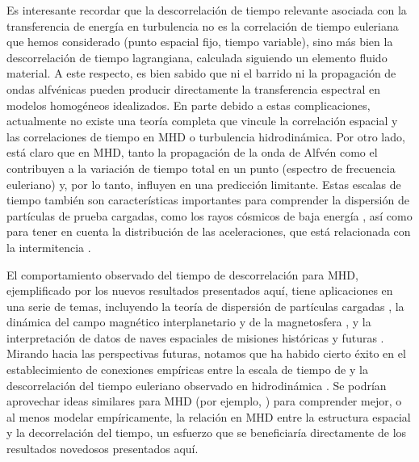 Es interesante recordar que la descorrelación de tiempo relevante
asociada con la transferencia de energía en turbulencia no es la
correlación de tiempo euleriana que hemos considerado (punto espacial
fijo, tiempo variable), sino más bien la descorrelación de tiempo
lagrangiana, calculada siguiendo un elemento fluido material. A este
respecto, es bien sabido que ni el barrido ni la propagación de ondas
alfvénicas pueden producir directamente la transferencia espectral en
modelos homogéneos idealizados. En parte debido a estas
complicaciones, actualmente no existe una teoría completa que vincule
la correlación espacial y las correlaciones de tiempo en MHD o
turbulencia hidrodinámica. Por otro lado, está claro que en MHD, tanto
la propagación de la onda de Alfvén como el \sweeping contribuyen a la
variación de tiempo total en un punto (espectro de frecuencia
euleriano) y, por lo tanto, influyen en una predicción
limitante. Estas escalas de tiempo también son características
importantes para comprender la dispersión de partículas de prueba
cargadas, como los rayos cósmicos de baja energía
\cite{bieber_proton_1994}, así como para tener en cuenta la
distribución de las aceleraciones, que está relacionada con la
intermitencia \cite{nelkin_time_1990}.

El comportamiento observado del tiempo de descorrelación para MHD,
ejemplificado por los nuevos resultados presentados aquí, tiene
aplicaciones en una serie de temas, incluyendo la teoría de dispersión
de partículas cargadas \cite{schlickeiser_cosmic-ray_1993,
  nelkin_time_1990}, la dinámica del campo magnético interplanetario y
de la magnetosfera \cite{miller_critical_1997}, y la interpretación de
datos de naves espaciales de misiones históricas y futuras
\cite{matthaeus_ensemble_2016}. Mirando hacia las perspectivas
futuras, notamos que ha habido cierto éxito en el establecimiento de
conexiones empíricas entre la escala de tiempo de \sweeping y la
descorrelación del tiempo euleriano observado en hidrodinámica
\cite{chen_sweeping_1989}. Se podrían aprovechar ideas similares para
MHD (por ejemplo, \cite{matthaeus_dynamical_1999}) para comprender
mejor, o al menos modelar empíricamente, la relación en MHD entre la
estructura espacial y la decorrelación del tiempo, un esfuerzo que se
beneficiaría directamente de los resultados novedosos presentados
aquí.
